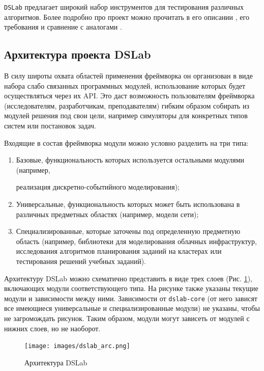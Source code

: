 \texttt{DSLab}\cite{dslab-repo} предлагает широкий набор инструментов для тестирования различных алгоритмов. Более подробно про проект можно прочитать в его описании \cite{dslab-description}, его требования \cite{dslab-requirements} и сравнение с аналогами \cite{dslab-analog-cmp}.

\subsection{Архитектура проекта DSLab}

В силу широты охвата областей применения фреймворка он организован в виде набора слабо связанных программных модулей, использование которых будет осуществляться через их API. Это даст возможность пользователям фреймворка (исследователям, разработчикам, преподавателям) гибким образом собирать из модулей решения под свои цели, например симуляторы для конкретных типов систем или постановок задач.

Входящие в состав фреймворка модули можно условно разделить на три типа:
\begin{enumerate}
    \item 
    Базовые, функциональность которых используется остальными модулями (например, 
    
    реализация дискретно-событийного моделирования);
    \item
    Универсальные, функциональность которых может быть использована в различных предметных областях (например, модели сети);
    \item
    Специализированные, которые заточены под определенную предметную область (например, библиотеки для моделирования облачных инфраструктур, исследования алгоритмов планирования заданий на кластерах или тестирования решений учебных заданий).
\end{enumerate}

Архитектуру DSLab можно схематично представить в виде трех слоев (Рис. \ref{dslab_arc}), включающих модули соответствующего типа. На рисунке также указаны текущие модули и зависимости между ними. Зависимости от \texttt{dslab-core} (от него зависят все имеющиеся универсальные и специализированные модули) не указаны, чтобы не загромождать рисунок. Таким образом, модули могут зависеть от модулей с нижних слоев, но не наоборот.

\begin{figure}[H]
    \centering
    \texttt{[image: images/dslab\_arc.png]}
    \caption{Архитектура DSLab}
    \label{dslab_arc}
\end{figure}

